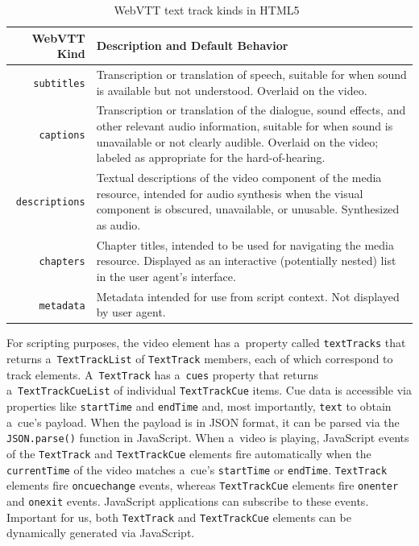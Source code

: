 \documentclass{sig-alternate}
\begin{document}
\begin{table}[b!]\footnotesize
\begin{tabular}{ r | p{5.5cm} } %
WebVTT Kind & Description and Default Behavior\\
\hline
\texttt{subtitles} & Transcription or translation of speech,
suitable for when sound is available but not understood.
Overlaid on the video.\\

\texttt{captions} & Transcription or translation of the dialogue,
sound effects, and other relevant audio information,
suitable for when sound is unavailable or not clearly audible.
Overlaid on the video;
labeled as appropriate for the hard-of-hearing.\\

\texttt{descriptions} & Textual descriptions of the video component
of the media resource, intended for audio synthesis
when the visual component is obscured, unavailable, or unusable.
Synthesized as audio.\\

\texttt{chapters} & Chapter titles, intended to be used for navigating
the media resource. Displayed as an interactive (potentially nested)
list in the user agent's interface.\\

\texttt{metadata} & Metadata intended for use from script context.
Not displayed by user agent.\\
\end{tabular}
  \caption{WebVTT text track kinds in HTML5~\cite{berjon2013html5}}
  \label{table:texttrackkinds}
\end{table}

For scripting purposes, the video element
has a~property called \texttt{textTracks}
that returns a~\texttt{TextTrackList} of
\texttt{TextTrack} members, each of which correspond
to track elements.
A~\texttt{TextTrack} has a~\texttt{cues} property
that returns a~\texttt{TextTrackCueList} of individual
\texttt{TextTrackCue} items.
Cue data is accessible via properties like
\texttt{startTime} and \texttt{endTime} and,
most importantly, \texttt{text} to obtain a~cue's payload.
When the payload is in JSON format,
it can be parsed via the
\texttt{JSON.parse()} function in JavaScript.
When a~video is playing,
JavaScript events of the \texttt{TextTrack} and \texttt{TextTrackCue}
elements fire automatically when the \texttt{currentTime}
of the video matches
a~cue's \texttt{startTime} or \texttt{endTime}.
\texttt{TextTrack} elements fire \texttt{oncuechange} events,
whereas \texttt{TextTrackCue} elements fire
\texttt{onenter} and \texttt{onexit} events.
JavaScript applications can subscribe to these events.
Important for us, both \texttt{TextTrack} and
\texttt{TextTrackCue} elements
can be dynamically generated via JavaScript.
\end{document}
